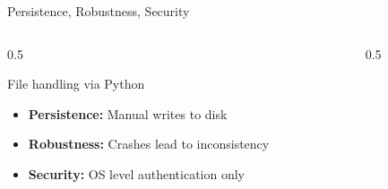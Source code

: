 \documentclass[aspectratio=169, xcolor=dvipsnames]{beamer}
\begin{document}
\begin{frame}{Persistence, Robustness, Security}
    \begin{columns}[T]
        \begin{column}{0.5\textwidth}
            \begin{alertblock}{File handling via Python}
                \begin{itemize}[<+->]
                    \item \textbf{Persistence:} Manual writes to disk
                    \item \textbf{Robustness:} Crashes lead to inconsistency
                    \item \textbf{Security:} OS level authentication only
                \end{itemize}
            \end{alertblock}
        \end{column}
        \begin{column}{0.5\textwidth}
        \end{column}
    \end{columns}
\end{frame}
\end{document}
